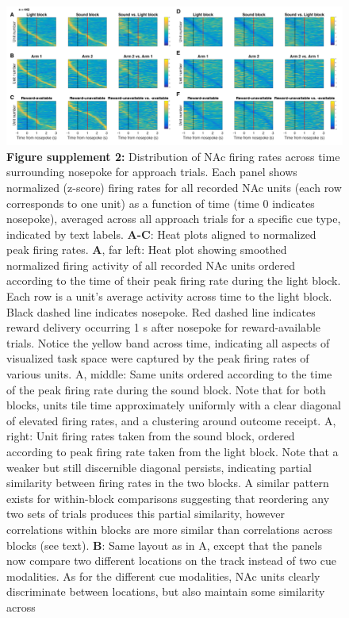 \documentclass[11pt]{article}
\newcommand{\bsf}[1]{\textbf{#1}}
\begin{document}
 \begin{figure}[ht!]
\centering
\includegraphics[width=\textwidth]{Fig 9 - SUPP NP Task tiling.pdf}
\caption*{\bsf{Figure supplement 2:} Distribution of NAc firing rates across time surrounding nosepoke for approach
trials. Each panel shows normalized (z-score) firing rates for all recorded NAc units
(each row corresponds to one unit) as a function of time (time 0 indicates
nosepoke), averaged across all approach trials for a specific cue type,
indicated by text labels. \bsf{A-C}: Heat plots aligned to normalized peak firing rates. \bsf{A}, far left: Heat plot showing smoothed
normalized firing activity of all recorded NAc units ordered according to the
time of their peak firing rate during the light block. Each row is a unit’s
average activity across time to the light block. Black dashed line indicates
nosepoke. Red dashed line indicates reward delivery occurring 1 s after
nosepoke for reward-available trials. Notice the yellow band across time,
indicating all aspects of visualized task space were captured by the peak
firing rates of various units. A, middle: Same units ordered according to
the time of the peak firing rate during the sound block. Note that for both
blocks, units tile time approximately uniformly with a clear diagonal of
elevated firing rates, and a clustering around outcome receipt. A, right: Unit firing rates taken from the sound block, ordered according to peak
firing rate taken from the light block. Note that a weaker but still
discernible diagonal persists, indicating partial similarity between firing
rates in the two blocks. A similar pattern exists for within-block comparisons suggesting that
reordering any two sets of trials produces this partial similarity, however
correlations within blocks are more similar than correlations across blocks
(see text). \bsf{B}: Same layout as in A, except
that the panels now compare two different locations on the track instead of
two cue modalities. As for the different cue modalities, NAc units clearly
discriminate between locations, but also maintain some similarity across
}
\end{figure}
\end{document}
